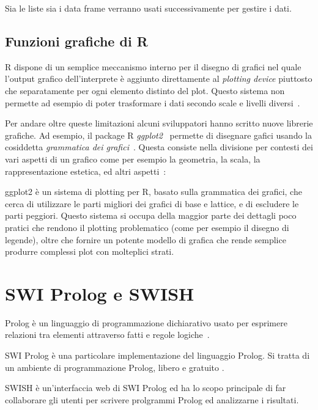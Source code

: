 \documentclass[10pt,titlepage,twoside,a4paper]{report}
\begin{document}
Sia le liste sia i data frame verranno usati successivamente per gestire i 
dati.

    \subsection{Funzioni grafiche di R}
R dispone di un semplice meccanismo interno per il disegno di grafici 
nel quale l'output grafico dell'interprete è aggiunto direttamente al 
\emph{plotting device} piuttosto che separatamente per ogni elemento distinto 
del plot. Questo sistema non permette ad esempio di poter trasformare i dati 
secondo scale e livelli diversi~\cite{ggplot2VsRbaseGraphics}.

Per andare oltre queste limitazioni alcuni sviluppatori hanno scritto nuove 
librerie grafiche. Ad esempio, il package R \emph{ggplot2}~\cite{ggplot2}
permette di disegnare gafici usando la cosiddetta \emph{grammatica dei 
grafici}~\cite{grammarOfGraphics}. Questa consiste nella divisione per 
contesti dei vari aspetti di un grafico come per esempio la geometria, la 
scala, la rappresentazione estetica, ed altri 
aspetti~\cite{ggplot2OriginalDefinition}:

\begin{displayquote}
ggplot2 è un sistema di plotting per R, basato sulla grammatica dei grafici,
che cerca di utilizzare le parti migliori dei grafici di base e lattice, e di 
escludere le parti peggiori. Questo sistema si occupa della maggior parte dei
dettagli poco pratici che rendono il plotting problematico (come per esempio 
il disegno di legende), oltre che fornire un potente modello di grafica che
rende semplice produrre complessi plot con molteplici strati.
\end{displayquote}




\section{SWI Prolog e SWISH}
Prolog è un linguaggio di programmazione dichiarativo usato per 
esprimere relazioni tra elementi attraverso fatti e regole 
logiche~\cite{prolog}.

SWI Prolog è una particolare implementazione del linguaggio Prolog. Si tratta 
di un ambiente di programmazione Prolog, libero e gratuito 
\cite{swiprolog}.

SWISH è un'interfaccia web di SWI Prolog \cite{swish}
ed ha lo scopo principale di far collaborare gli utenti per scrivere 
prolgrammi Prolog ed analizzarne i risultati.
\end{document}

